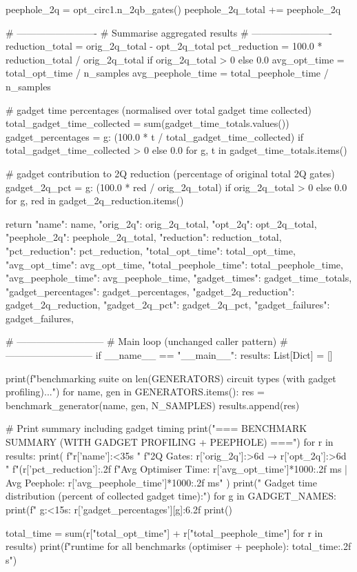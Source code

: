         peephole_2q = opt_circ1.n_2qb_gates()
        peephole_2q_total += peephole_2q

    # -------------------------
    # Summarise aggregated results
    # -------------------------
    reduction_total = orig_2q_total - opt_2q_total
    pct_reduction = 100.0 * reduction_total / orig_2q_total if orig_2q_total > 0 else 0.0
    avg_opt_time = total_opt_time / n_samples
    avg_peephole_time = total_peephole_time / n_samples

    # gadget time percentages (normalised over total gadget time collected)
    total_gadget_time_collected = sum(gadget_time_totals.values())
    gadget_percentages = {
        g: (100.0 * t / total_gadget_time_collected) if total_gadget_time_collected > 0 else 0.0
        for g, t in gadget_time_totals.items()
    }

    # gadget contribution to 2Q reduction (percentage of original total 2Q gates)
    gadget_2q_pct = {
        g: (100.0 * red / orig_2q_total) if orig_2q_total > 0 else 0.0
        for g, red in gadget_2q_reduction.items()
    }

    return {
        "name": name,
        "orig_2q": orig_2q_total,
        "opt_2q": opt_2q_total,
        "peephole_2q": peephole_2q_total,
        "reduction": reduction_total,
        "pct_reduction": pct_reduction,
        "total_opt_time": total_opt_time,
        "avg_opt_time": avg_opt_time,
        "total_peephole_time": total_peephole_time,
        "avg_peephole_time": avg_peephole_time,
        "gadget_times": gadget_time_totals,
        "gadget_percentages": gadget_percentages,
        "gadget_2q_reduction": gadget_2q_reduction,
        "gadget_2q_pct": gadget_2q_pct,
        "gadget_failures": gadget_failures,
    }

# ---------------------------
# Main loop (unchanged caller pattern)
# ---------------------------
if __name__ == "__main__":
    results: List[Dict] = []

    print(f"\nRunning benchmarking suite on {len(GENERATORS)} circuit types (with gadget profiling)...")
    for name, gen in GENERATORS.items():
        res = benchmark_generator(name, gen, N_SAMPLES)
        results.append(res)

    # Print summary including gadget timing
    print("\n=== BENCHMARK SUMMARY (WITH GADGET PROFILING + PEEPHOLE) ===")
    for r in results:
        print(
            f"{r['name']:<35s} "
            f"2Q Gates: {r['orig_2q']:>6d} → {r['opt_2q']:>6d} "
            f"({r['pct_reduction']:.2f}%
            f"Avg Optimiser Time: {r['avg_opt_time']*1000:.2f} ms | Avg Peephole: {r['avg_peephole_time']*1000:.2f} ms"
        )
        print("  Gadget time distribution (percent of collected gadget time):")
        for g in GADGET_NAMES:
            print(f"    {g:<15s}: {r['gadget_percentages'][g]:6.2f}%
        print()

    total_time = sum(r["total_opt_time"] + r["total_peephole_time"] for r in results)
    print(f"\nTotal runtime for all benchmarks (optimiser + peephole): {total_time:.2f} s")
